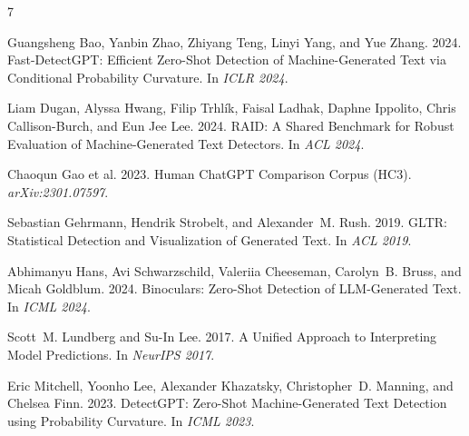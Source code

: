 \documentclass[sigconf,nonacm]{acmart}
\begin{document}

\begin{thebibliography}{7}

Guangsheng Bao, Yanbin Zhao, Zhiyang Teng, Linyi Yang, and Yue Zhang. 2024.
\newblock Fast-DetectGPT: Efficient Zero-Shot Detection of Machine-Generated Text via Conditional Probability Curvature.
\newblock In \emph{ICLR 2024}.

Liam Dugan, Alyssa Hwang, Filip Trhl\'{i}k, Faisal Ladhak, Daphne Ippolito, Chris Callison-Burch, and Eun Jee Lee. 2024.
\newblock RAID: A Shared Benchmark for Robust Evaluation of Machine-Generated Text Detectors.
\newblock In \emph{ACL 2024}.

Chaoqun Gao et al. 2023.
\newblock Human ChatGPT Comparison Corpus (HC3).
\newblock \emph{arXiv:2301.07597}.

Sebastian Gehrmann, Hendrik Strobelt, and Alexander~M. Rush. 2019.
\newblock GLTR: Statistical Detection and Visualization of Generated Text.
\newblock In \emph{ACL 2019}.

Abhimanyu Hans, Avi Schwarzschild, Valeriia Cheeseman, Carolyn~B. Bruss, and Micah Goldblum. 2024.
\newblock Binoculars: Zero-Shot Detection of LLM-Generated Text.
\newblock In \emph{ICML 2024}.

Scott~M. Lundberg and Su-In Lee. 2017.
\newblock A Unified Approach to Interpreting Model Predictions.
\newblock In \emph{NeurIPS 2017}.

Eric Mitchell, Yoonho Lee, Alexander Khazatsky, Christopher~D. Manning, and Chelsea Finn. 2023.
\newblock DetectGPT: Zero-Shot Machine-Generated Text Detection using Probability Curvature.
\newblock In \emph{ICML 2023}.

\end{thebibliography}
\end{document}
